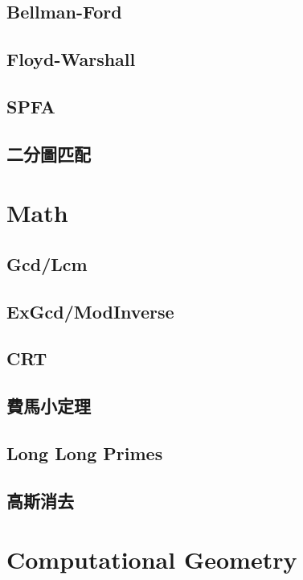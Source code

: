 	\subsection{Bellman-Ford}
		
	\subsection{Floyd-Warshall}
		
	\subsection{SPFA}
		
	\subsection{二分圖匹配}
		
\section{Math}
	\subsection{Gcd/Lcm}
		
	\subsection{ExGcd/ModInverse}
		
	\subsection{CRT}
		
	\subsection{費馬小定理}
		
	\subsection{Long Long Primes}
		
	\subsection{高斯消去}
		
\section{Computational Geometry}
